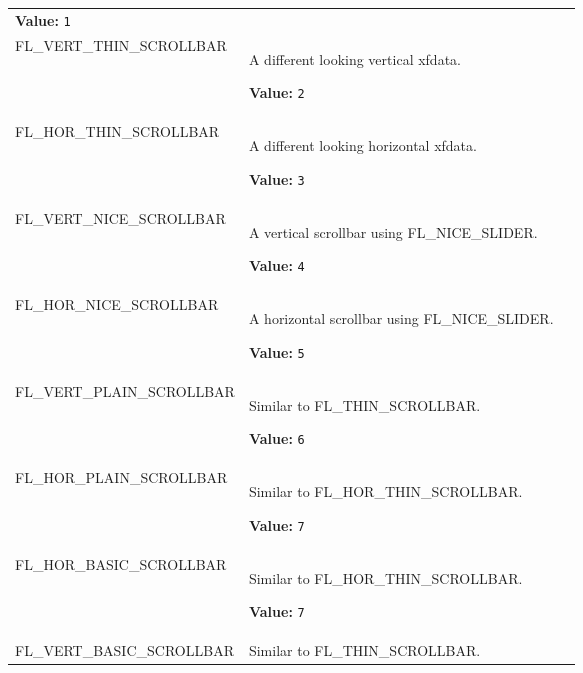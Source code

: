 \begin{longtable}{|p{\varnamewidth}|p{\vardescrwidth}|l}
\textbf{Value:} 
{\tt 1}&\\
\cline{1-2}
\raggedright F\-L\-\_\-V\-E\-R\-T\-\_\-T\-H\-I\-N\-\_\-S\-C\-R\-O\-L\-L\-B\-A\-R\- & \raggedright A different looking vertical xfdata.

\textbf{Value:} 
{\tt 2}&\\
\cline{1-2}
\raggedright F\-L\-\_\-H\-O\-R\-\_\-T\-H\-I\-N\-\_\-S\-C\-R\-O\-L\-L\-B\-A\-R\- & \raggedright A different looking horizontal xfdata.

\textbf{Value:} 
{\tt 3}&\\
\cline{1-2}
\raggedright F\-L\-\_\-V\-E\-R\-T\-\_\-N\-I\-C\-E\-\_\-S\-C\-R\-O\-L\-L\-B\-A\-R\- & \raggedright A vertical scrollbar using FL\_NICE\_SLIDER.

\textbf{Value:} 
{\tt 4}&\\
\cline{1-2}
\raggedright F\-L\-\_\-H\-O\-R\-\_\-N\-I\-C\-E\-\_\-S\-C\-R\-O\-L\-L\-B\-A\-R\- & \raggedright A horizontal scrollbar using FL\_NICE\_SLIDER.

\textbf{Value:} 
{\tt 5}&\\
\cline{1-2}
\raggedright F\-L\-\_\-V\-E\-R\-T\-\_\-P\-L\-A\-I\-N\-\_\-S\-C\-R\-O\-L\-L\-B\-A\-R\- & \raggedright Similar to FL\_THIN\_SCROLLBAR.

\textbf{Value:} 
{\tt 6}&\\
\cline{1-2}
\raggedright F\-L\-\_\-H\-O\-R\-\_\-P\-L\-A\-I\-N\-\_\-S\-C\-R\-O\-L\-L\-B\-A\-R\- & \raggedright Similar to FL\_HOR\_THIN\_SCROLLBAR.

\textbf{Value:} 
{\tt 7}&\\
\cline{1-2}
\raggedright F\-L\-\_\-H\-O\-R\-\_\-B\-A\-S\-I\-C\-\_\-S\-C\-R\-O\-L\-L\-B\-A\-R\- & \raggedright Similar to FL\_HOR\_THIN\_SCROLLBAR.

\textbf{Value:} 
{\tt 7}&\\
\cline{1-2}
\raggedright F\-L\-\_\-V\-E\-R\-T\-\_\-B\-A\-S\-I\-C\-\_\-S\-C\-R\-O\-L\-L\-B\-A\-R\- & \raggedright Similar to FL\_THIN\_SCROLLBAR.


\end{longtable}
